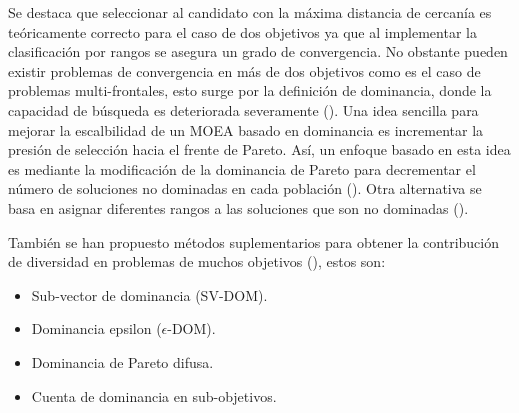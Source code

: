 %
%
%

%
%
%


Se destaca que seleccionar al candidato con la máxima distancia de cercanía es teóricamente correcto para el caso de dos objetivos ya que al implementar la clasificación por rangos se asegura un grado de convergencia.
%
No obstante pueden existir problemas de convergencia en más de dos objetivos como es el caso de problemas multi-frontales, esto surge por la definición de dominancia, donde la capacidad de búsqueda es deteriorada severamente (\cite{Joel:MOEA_Survey}).
%
Una idea sencilla para mejorar la escalbilidad de un MOEA basado en dominancia es incrementar la presión de selección hacia el frente de Pareto.
%
Así, un enfoque basado en esta idea es mediante la modificación de la dominancia de Pareto para decrementar el número de soluciones no dominadas en cada población (\cite{Joel:Dominance_Area}).
%
Otra alternativa se basa en asignar diferentes rangos a las soluciones que son no dominadas (\cite{Joel:MOEA_Optimisation_Based_on_Relation_Favour, Joel:Ranking_Dominance_And_Many_Objective_Optimization}).
%

También se han propuesto métodos suplementarios para obtener la contribución de diversidad en problemas de muchos objetivos (\cite{Joel:Substitute_Distance_Assignments_in_NSGA_II_Many_Objective_Problems}), estos son:
\begin{itemize}
\item Sub-vector de dominancia (SV-DOM).
\item Dominancia epsilon ($\epsilon$-DOM).
\item Dominancia de Pareto difusa.
\item Cuenta de dominancia en sub-objetivos.

\end{itemize}


